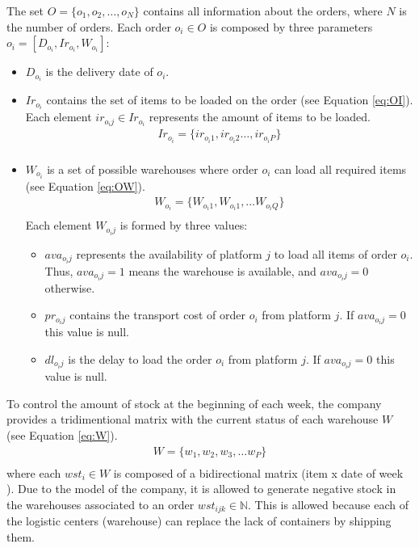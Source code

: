 \documentclass[letterpaper]{article} %
\begin{document}
The set $O = \{o_1, o_2, \dots, o_N \}$ contains all information about the orders, where $N$ is the number of orders. Each order $o_i \in O$ is composed by three parameters $o_i =[D_{o_i},Ir_{o_i},W_{o_i}]$:
\begin{itemize}
    \item $D_{o_i}$ is the delivery date of $o_i$.
    \item $Ir_{o_i}$ contains the set of items to be loaded on the order (see Equation \ref{eq:OI}). Each element $ir_{o_{i}j} \in Ir_{o_i}$ represents the amount of items to be loaded.
    \begin{equation}\label{eq:OI}
        \begin{aligned}
            Ir_{o_{i}} = \{ ir_{o_{i}1}, ir_{o_{i}2} \dots, ir_{o_{i}P} \} \\
        \end{aligned}
    \end{equation}
    \item $W_{o_i}$ is a set of possible warehouses where order $o_i$ can load all required items (see Equation \ref{eq:OW}).
    \begin{equation} \label{eq:OW}
        \begin{aligned}
            W_{o_i} = \{ W_{o_{i}1}, W_{o_{i}1}, \dots W_{o_{i}Q} \}\\
        \end{aligned}
    \end{equation}
    Each element $W_{o_{i}j}$ is formed by three values:
    \begin{itemize}
        \item $ava_{o_{i}j}$ represents the availability of platform $j$ to load all items of order $o_i$. Thus, $ava_{o_{i}j}=1$  means the warehouse is available, and $ava_{o_{i}j}=0$ otherwise.
        \item $pr_{o_{i}j}$ contains the transport cost of order $o_i$ from platform $j$. If $ava_{o_{i}j}=0$ this value is null.
        \item $dl_{o_{i}j}$ is the delay to load the order $o_i$ from platform $j$. If $ava_{o_{i}j}=0$ this value is null.
    \end{itemize}
\end{itemize}

To control the amount of stock at the beginning of each week, the company provides a tridimentional matrix with the current status of each warehouse $W$ (see Equation \ref{eq:W}).
\begin{equation}
    \begin{aligned}\label{eq:W}
        W = \{w_1, w_2, w_3, \dots w_P \}\\
    \end{aligned}
\end{equation}
where each $wst_i \in W$ is composed of a bidirectional matrix (item x date of week ). Due to the model of the company, it is allowed to generate negative stock in the warehouses associated to an order $wst_{ijk} \in \mathbb{N} $. This is allowed because each of the logistic centers (warehouse) can replace the lack of containers by shipping them.
\end{document}

